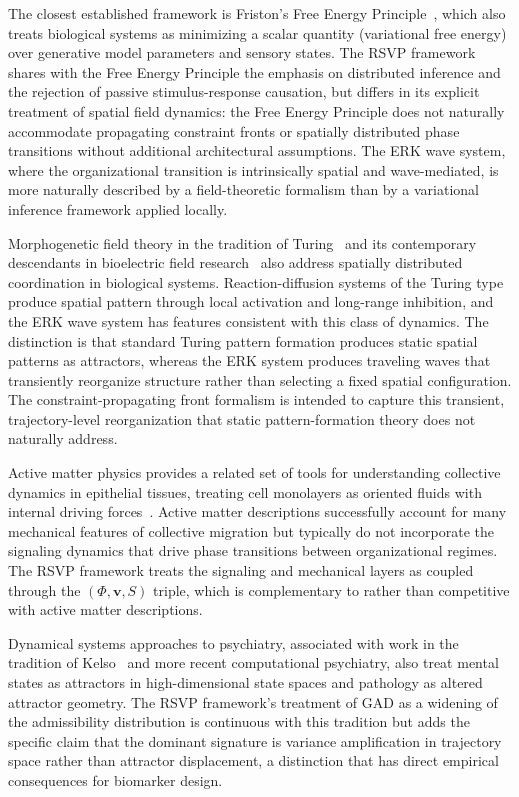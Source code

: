 \documentclass[11pt,a4paper]{article}
\theoremstyle{plain}
\theoremstyle{definition}
\begin{document}
The closest established framework is Friston's Free Energy Principle~\cite{Friston2010},
which also treats biological systems as minimizing a scalar quantity (variational free
energy) over generative model parameters and sensory states. The RSVP framework shares
with the Free Energy Principle the emphasis on distributed inference and the rejection
of passive stimulus-response causation, but differs in its explicit treatment of
spatial field dynamics: the Free Energy Principle does not naturally accommodate
propagating constraint fronts or spatially distributed phase transitions without
additional architectural assumptions. The ERK wave system, where the organizational
transition is intrinsically spatial and wave-mediated, is more naturally described
by a field-theoretic formalism than by a variational inference framework applied locally.

Morphogenetic field theory in the tradition of Turing~\cite{Turing1952} and its
contemporary descendants in bioelectric field research~\cite{Levin2012} also address
spatially distributed coordination in biological systems. Reaction-diffusion systems of
the Turing type produce spatial pattern through local activation and long-range inhibition,
and the ERK wave system has features consistent with this class of dynamics. The
distinction is that standard Turing pattern formation produces static spatial patterns
as attractors, whereas the ERK system produces traveling waves that transiently reorganize
structure rather than selecting a fixed spatial configuration. The constraint-propagating
front formalism is intended to capture this transient, trajectory-level reorganization
that static pattern-formation theory does not naturally address.

Active matter physics provides a related set of tools for understanding collective
dynamics in epithelial tissues, treating cell monolayers as oriented fluids with
internal driving forces~\cite{Haken1983}. Active matter descriptions successfully account
for many mechanical features of collective migration but typically do not incorporate
the signaling dynamics that drive phase transitions between organizational regimes.
The RSVP framework treats the signaling and mechanical layers as coupled through the
$(\Phi, \mathbf{v}, S)$ triple, which is complementary to rather than competitive with
active matter descriptions.

Dynamical systems approaches to psychiatry, associated with work in the tradition of
Kelso~\cite{Kelso1995} and more recent computational psychiatry, also treat mental
states as attractors in high-dimensional state spaces and pathology as altered attractor
geometry. The RSVP framework's treatment of GAD as a widening of the admissibility
distribution is continuous with this tradition but adds the specific claim that the
dominant signature is variance amplification in trajectory space rather than attractor
displacement, a distinction that has direct empirical consequences for biomarker design.
\end{document}

